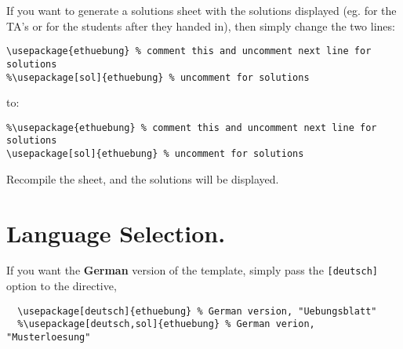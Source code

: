 \documentclass[11pt,a4paper]{article}
\begin{document}
If you want to generate a solutions sheet with the solutions displayed (eg. for the TA's
or for the students after they handed in), then simply change the two lines:
\begin{pkgverbatim}
\begin{verbatim}
\usepackage{ethuebung} % comment this and uncomment next line for solutions
%\usepackage[sol]{ethuebung} % uncomment for solutions
\end{verbatim}
\end{pkgverbatim}
to:
\begin{pkgverbatim}
\begin{verbatim}
%\usepackage{ethuebung} % comment this and uncomment next line for solutions
\usepackage[sol]{ethuebung} % uncomment for solutions
\end{verbatim}
\end{pkgverbatim}

Recompile the sheet, and the solutions will be displayed.


\section*{Language Selection.}

If you want the {\bfseries German} version of the template, simply pass the
\texttt{[deutsch]} option to the  directive,
\begin{pkgverbatim}
\begin{verbatim}
  \usepackage[deutsch]{ethuebung} % German version, "Uebungsblatt"
  %\usepackage[deutsch,sol]{ethuebung} % German verion, "Musterloesung"
\end{verbatim}
\end{pkgverbatim}
\end{document}
